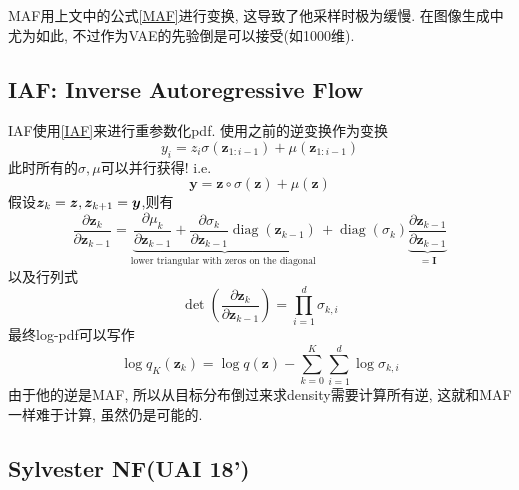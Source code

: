 \documentclass{article}
\begin{document}
MAF用上文中的公式\eqref{MAF}进行变换, 这导致了他采样时极为缓慢. 在图像生成中尤为如此, 不过作为VAE的先验倒是可以接受(如1000维).

\subsection{IAF: Inverse Autoregressive Flow}

IAF使用\eqref{IAF}来进行重参数化pdf. 使用之前的逆变换作为变换
\begin{equation}
    y_{i}=z_{i} \sigma\left(\mathbf{z}_{1: i-1}\right)+\mu\left(\mathbf{z}_{1: i-1}\right)
\end{equation}
此时所有的$\sigma,\mu$可以并行获得! i.e.
\begin{equation}
    \mathbf{y}=\mathbf{z} \circ \sigma(\mathbf{z})+\mu(\mathbf{z})
\end{equation}
假设$\boldsymbol{z}_{k}=\boldsymbol{z}, \boldsymbol{z}_{k+1} = \boldsymbol{y}$,则有
\begin{equation}
    \frac{\partial \mathbf{z}_{k}}{\partial \mathbf{z}_{k-1}}=\underbrace{\frac{\partial \mu_{k}}{\partial \mathbf{z}_{k-1}}+\frac{\partial \sigma_{k}}{\partial \mathbf{z}_{k-1}} \operatorname{diag}\left(\mathbf{z}_{k-1}\right)}_{\text {lower triangular with zeros on the diagonal }}+\operatorname{diag}\left(\sigma_{k}\right) \underbrace{\frac{\partial \mathbf{z}_{k-1}}{\partial \mathbf{z}_{k-1}}}_{=\mathbf{I}}
\end{equation}
以及行列式
\begin{equation}
    \operatorname{det}\left(\frac{\partial \mathbf{z}_{k}}{\partial \mathbf{z}_{k-1}}\right)=\prod_{i=1}^{d} \sigma_{k, i}
\end{equation}
最终log-pdf可以写作
\begin{equation}
    \log q_{K}\left(\mathbf{z}_{k}\right)=\log q(\mathbf{z})-\sum_{k=0}^{K} \sum_{i=1}^{d} \log \sigma_{k, i}
\end{equation}
由于他的逆是MAF, 所以从目标分布倒过来求density需要计算所有逆, 这就和MAF一样难于计算, 虽然仍是可能的.

\subsection{Sylvester NF(UAI 18')}
\end{document}
